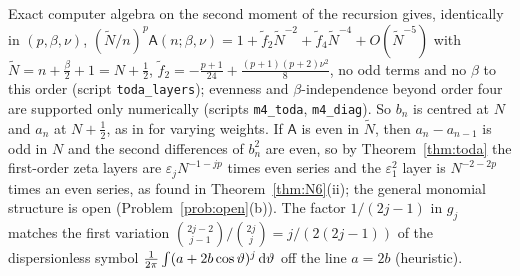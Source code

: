 \begin{remark}\label{rem:diag}
Exact computer algebra on the second moment of the recursion gives, identically in $(p,\beta,\nu)$, $(\tilde N/n)^p\mathsf A(n;\beta,\nu)=1+\tilde f_2\tilde N^{-2}+\tilde f_4\tilde N^{-4}+O(\tilde N^{-5})$
with $\tilde N=n+\frac\beta2+1=N+\frac12$, $\tilde f_2=-\frac{p+1}{24}+\frac{(p+1)(p+2)\nu^2}8$, no odd terms and no $\beta$ to this order (script
\texttt{toda\_layers}); evenness and $\beta$-independence beyond order four are supported only numerically (scripts \texttt{m4\_toda},
\texttt{m4\_diag}). So $b_n$ is centred at $N$ and $a_n$ at $N+\frac12$, as in \cite[Theorem~5.2]{BleherIts} for varying weights. If $\mathsf A$ is even in
$\tilde N$, then $a_n-a_{n-1}$ is odd in $N$ and the second differences of $b_n^2$ are even, so by Theorem~\ref{thm:toda} the first-order zeta layers are
$\varepsilon_jN^{-1-jp}$ times even series and the $\varepsilon_1^2$ layer is $N^{-2-2p}$ times an even series, as found in
Theorem~\ref{thm:N6}(ii); the general monomial structure is open (Problem~\ref{prob:open}(b)). The factor $1/(2j-1)$ in $g_j$ matches the first
variation $\binom{2j-2}{j-1}/\binom{2j}j=j/(2(2j-1))$ of the dispersionless symbol $\frac1{2\pi}\int(a+2b\cos\vartheta)^j\,\mathrm{d}\vartheta$ off the line $a=2b$
(heuristic).
\end{remark}

